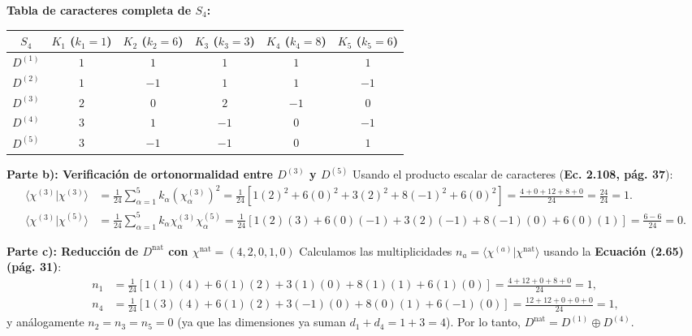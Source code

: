 \documentclass[11pt, a4paper]{article}
\begin{document}
\noindent \textbf{Tabla de caracteres completa de $S_4$:}
\begin{center}
\renewcommand{\arraystretch}{1.25}
\begin{tabular}{c|ccccc}
\toprule
$S_4$ & $K_1$ ($k_1=1$) & $K_2$ ($k_2=6$) & $K_3$ ($k_3=3$) & $K_4$ ($k_4=8$) & $K_5$ ($k_5=6$) \\
\midrule
$D^{(1)}$ & $1$ & $1$ & $1$ & $1$ & $1$ \\
$D^{(2)}$ & $1$ & $-1$ & $1$ & $1$ & $-1$ \\
$D^{(3)}$ & $2$ & $0$ & $2$ & $-1$ & $0$ \\
$D^{(4)}$ & $3$ & $1$ & $-1$ & $0$ & $-1$ \\
$D^{(5)}$ & $3$ & $-1$ & $-1$ & $0$ & $1$ \\
\bottomrule
\end{tabular}
\end{center}

\noindent \textbf{Parte b): Verificación de ortonormalidad entre $D^{(3)}$ y $D^{(5)}$}
Usando el producto escalar de caracteres (\textbf{Ec. 2.108, pág. 37}):
\begin{align*}
    \langle \chi^{(3)} | \chi^{(3)} \rangle &= \frac{1}{24} \sum_{\alpha=1}^5 k_\alpha \left(\chi_\alpha^{(3)}\right)^2 = \frac{1}{24} \left[ 1(2)^2 + 6(0)^2 + 3(2)^2 + 8(-1)^2 + 6(0)^2 \right] = \frac{4 + 0 + 12 + 8 + 0}{24} = \frac{24}{24} = 1. \\
    \langle \chi^{(3)} | \chi^{(5)} \rangle &= \frac{1}{24} \sum_{\alpha=1}^5 k_\alpha \chi_\alpha^{(3)} \chi_\alpha^{(5)} = \frac{1}{24} \left[ 1(2)(3) + 6(0)(-1) + 3(2)(-1) + 8(-1)(0) + 6(0)(1) \right] = \frac{6 - 6}{24} = 0.
\end{align*}

\noindent \textbf{Parte c): Reducción de $D^{\text{nat}}$ con $\chi^{\text{nat}} = (4, 2, 0, 1, 0)$}
Calculamos las multiplicidades $n_a = \langle \chi^{(a)} | \chi^{\text{nat}} \rangle$ usando la \textbf{Ecuación (2.65) (pág. 31)}:
\begin{align*}
    n_1 &= \frac{1}{24} \left[ 1(1)(4) + 6(1)(2) + 3(1)(0) + 8(1)(1) + 6(1)(0) \right] = \frac{4 + 12 + 0 + 8 + 0}{24} = 1, \\
    n_4 &= \frac{1}{24} \left[ 1(3)(4) + 6(1)(2) + 3(-1)(0) + 8(0)(1) + 6(-1)(0) \right] = \frac{12 + 12 + 0 + 0 + 0}{24} = 1,
\end{align*}
y análogamente $n_2 = n_3 = n_5 = 0$ (ya que las dimensiones ya suman $d_1 + d_4 = 1 + 3 = 4$). Por lo tanto, $D^{\text{nat}} = D^{(1)} \oplus D^{(4)}$.
\end{document}
